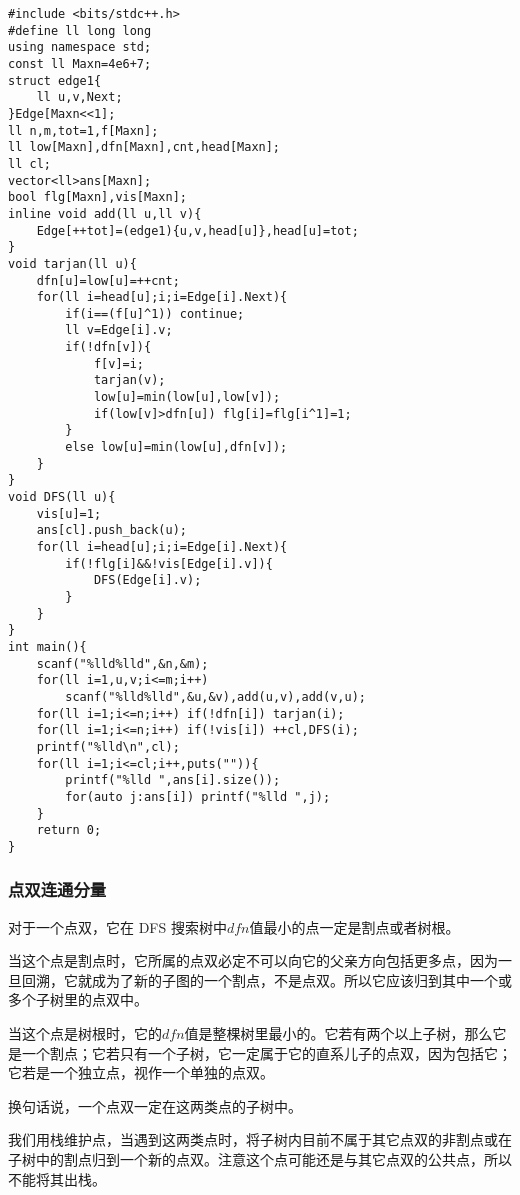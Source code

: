 \documentclass[]{article}
\begin{document}
\begin{verbatim}
#include <bits/stdc++.h>
#define ll long long
using namespace std;
const ll Maxn=4e6+7;
struct edge1{
    ll u,v,Next;
}Edge[Maxn<<1];
ll n,m,tot=1,f[Maxn];
ll low[Maxn],dfn[Maxn],cnt,head[Maxn];
ll cl;
vector<ll>ans[Maxn];
bool flg[Maxn],vis[Maxn];
inline void add(ll u,ll v){
    Edge[++tot]=(edge1){u,v,head[u]},head[u]=tot;
}
void tarjan(ll u){
    dfn[u]=low[u]=++cnt;
    for(ll i=head[u];i;i=Edge[i].Next){
        if(i==(f[u]^1)) continue;
        ll v=Edge[i].v;
        if(!dfn[v]){
            f[v]=i;
            tarjan(v);
            low[u]=min(low[u],low[v]);
            if(low[v]>dfn[u]) flg[i]=flg[i^1]=1;
        }
        else low[u]=min(low[u],dfn[v]);
    }
}
void DFS(ll u){
    vis[u]=1;
    ans[cl].push_back(u);
    for(ll i=head[u];i;i=Edge[i].Next){
        if(!flg[i]&&!vis[Edge[i].v]){
            DFS(Edge[i].v);
        }
    }
}
int main(){
    scanf("%lld%lld",&n,&m);
    for(ll i=1,u,v;i<=m;i++) 
        scanf("%lld%lld",&u,&v),add(u,v),add(v,u); 
    for(ll i=1;i<=n;i++) if(!dfn[i]) tarjan(i);
    for(ll i=1;i<=n;i++) if(!vis[i]) ++cl,DFS(i);
    printf("%lld\n",cl);
    for(ll i=1;i<=cl;i++,puts("")){
        printf("%lld ",ans[i].size());
        for(auto j:ans[i]) printf("%lld ",j);
    }
    return 0;
}
\end{verbatim}

\hypertarget{ux70b9ux53ccux8fdeux901aux5206ux91cf}{%
\subsubsection{点双连通分量}\label{ux70b9ux53ccux8fdeux901aux5206ux91cf}}

对于一个点双，它在 DFS 搜索树中\(dfn\)值最小的点一定是割点或者树根。

当这个点是割点时，它所属的点双必定不可以向它的父亲方向包括更多点，因为一旦回溯，它就成为了新的子图的一个割点，不是点双。所以它应该归到其中一个或多个子树里的点双中。

当这个点是树根时，它的\(dfn\)值是整棵树里最小的。它若有两个以上子树，那么它是一个割点；它若只有一个子树，它一定属于它的直系儿子的点双，因为包括它；它若是一个独立点，视作一个单独的点双。

换句话说，一个点双一定在这两类点的子树中。

我们用栈维护点，当遇到这两类点时，将子树内目前不属于其它点双的非割点或在子树中的割点归到一个新的点双。注意这个点可能还是与其它点双的公共点，所以不能将其出栈。
\end{document}
